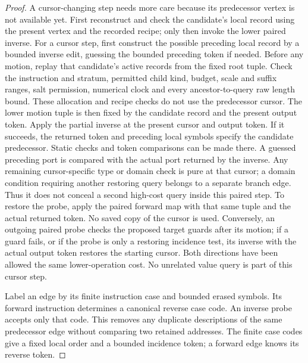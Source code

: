 \begin{proof}
A cursor-changing step needs more care because its predecessor vertex is not available yet. First reconstruct and check the candidate's local record using the present vertex and the recorded recipe; only then invoke the lower paired inverse. For a cursor step, first construct the possible preceding local record
by a bounded inverse edit, guessing the bounded preceding token if
needed.  Before any motion, replay that candidate's active records from
the fixed root tuple.  Check the instruction and stratum, permitted
child kind, budget, scale and suffix ranges, salt permission, numerical
clock and every ancestor-to-query raw length bound.  These allocation
and recipe checks do not use the predecessor cursor.  The lower motion
tuple is then fixed by the candidate record and the present output
token.  Apply the partial inverse at the present cursor
and output token.  If it succeeds, the returned token and preceding
local symbols specify the candidate predecessor.  Static checks and
token comparisons can be made there.
A guessed preceding port is compared with the actual port returned by
the inverse.  Any remaining cursor-specific type or domain check is
pure at that cursor; a domain condition requiring another restoring
query belongs to a separate branch edge.  Thus it does not conceal a
second high-cost query inside this paired step.
To restore the probe, apply the
paired forward map with that same tuple and the actual returned token.
No saved copy of the cursor is used.  Conversely, an outgoing paired
probe checks the proposed target guards after its motion; if a guard
fails, or if the probe is only a restoring incidence test, its inverse
with the actual output token restores the starting cursor.  Both
directions have been allowed
the same lower-operation cost.  No unrelated value query is part of
this cursor step.

Label an edge by its finite instruction case and bounded erased
symbols.  Its forward instruction determines a canonical reverse case
code.  An inverse probe accepts only that code.  This removes any
duplicate descriptions of the same predecessor edge without comparing
two retained addresses.  The finite case codes give a fixed local order
and a bounded incidence token; a forward edge knows its reverse token.


\end{proof}
